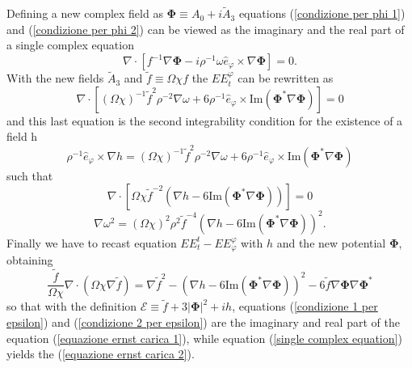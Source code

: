Defining a new complex field as $\boldsymbol{\Phi} \equiv A_0 + i \tilde{A}_3$ equations (\ref{condizione per phi 1}) and (\ref{condizione per phi 2}) can be viewed as the imaginary and the real part of a single complex equation 
\begin{equation}
    \nabla\cdot[f^{-1}\nabla \boldsymbol{\Phi} - i\rho^{-1}\omega\hat{e}_{\varphi} \times \nabla \boldsymbol{\Phi}]=0.
    \label{single complex equation}
\end{equation}
With the new fields $\tilde{A}_3$ and $\tilde{f}\equiv \Omega\chi f$ the $EE^{\varphi}_t$ can be rewritten as 
\begin{equation}
    \nabla \cdot [(\Omega\chi)^{-1}\tilde{f}^2\rho^{-2}\nabla\omega+6\rho^{-1}\hat{e}_{\varphi} \times \mathrm{Im}(\boldsymbol{\Phi}^*\nabla \boldsymbol{\Phi})]= 0
\end{equation}
and this last equation is the second integrability condition for the existence of a field h 
\begin{equation}
    \rho^{-1}\hat{e}_{\varphi} \times \nabla h = (\Omega\chi)^{-1}\tilde{f}^2\rho^{-2}\nabla\omega+6\rho^{-1}\hat{e}_{\varphi} \times \mathrm{Im}(\boldsymbol{\Phi}^*\nabla \boldsymbol{\Phi})
    \label{definizione h elettro}
\end{equation}
such that
\begin{equation}
    \nabla \cdot [\Omega\chi\tilde{f}^{-2}(\nabla h -6\mathrm{Im}(\boldsymbol{\Phi}^*\nabla \boldsymbol{\Phi}))]= 0
    \label{condizione 1 per epsilon}
\end{equation}
\begin{equation}
    \nabla \omega^2= (\Omega\chi)^2\rho^2\tilde{f}^{-4}(\nabla h -6\mathrm{Im}(\boldsymbol{\Phi}^*\nabla \boldsymbol{\Phi}))^2.
\end{equation}
Finally we have to recast equation $EE^t_t- EE^{\varphi}_{\varphi}$ with $h$ and the new potential $\boldsymbol{\Phi}$, obtaining
\begin{equation}
    \frac{\tilde{f}}{\Omega\chi}\nabla\cdot (\Omega\chi\nabla \tilde{f})=\nabla\tilde{f}^2-(\nabla h -6\mathrm{Im}(\boldsymbol{\Phi}^*\nabla \boldsymbol{\Phi}))^2 -6\tilde{f}\nabla\boldsymbol{\Phi}\nabla\boldsymbol{\Phi}^*
    \label{condizione 2 per epsilon}
\end{equation}
so that with the definition $\mathcal{E}\equiv\tilde{f}+3|\boldsymbol{\Phi}|^2+ih$, equations (\ref{condizione 1 per epsilon}) and (\ref{condizione 2 per epsilon}) are the imaginary and real part of the equation (\ref{equazione ernst carica 1}), while equation (\ref{single complex equation}) yields the (\ref{equazione ernst carica 2}).


